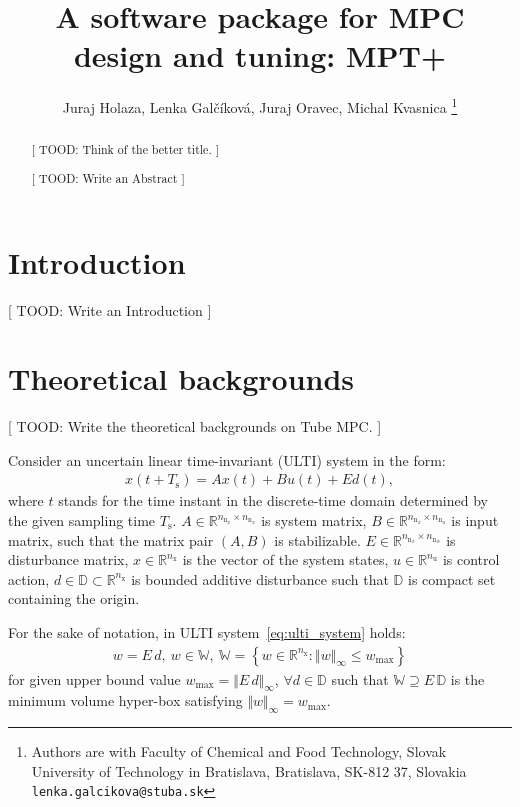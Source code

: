 \documentclass[letterpaper, 10 pt, conference]{ieeeconf}
\title{\LARGE \bf
A software package for MPC design and tuning: MPT+
}
\author{Juraj Holaza, Lenka Gal\v{c}\'{i}kov\'{a}, Juraj Oravec, Michal Kvasnica
\thanks{Authors are with Faculty of Chemical and Food Technology,
		Slovak University of Technology in Bratislava, Bratislava, SK-812 37, Slovakia
        \texttt{lenka.galcikova@stuba.sk}}
}
\begin{document}
\maketitle
\thispagestyle{empty}
\pagestyle{empty}

\begin{abstract}

[ TOOD: Think of the better title. ]

[ TOOD: Write an Abstract ]

\end{abstract}

\section{Introduction}
\label{sec:introduction}

[ TOOD: Write an Introduction ]


\section{Theoretical backgrounds}
\label{sec:tube_mpc}

[ TOOD: Write the theoretical backgrounds on Tube MPC. ]

Consider an uncertain linear time-invariant (ULTI) system in the form:
\begin{eqnarray}
	\label{eq:ulti_system}
	x(t+T_{\mathrm{s}}) = A x(t) + B u(t) + E d(t), %
\end{eqnarray}
where $t$ stands for the time instant in the discrete-time domain determined by the given sampling time $T_{\mathrm{s}}$. $A \in \mathbb{R}^{n_{\mathrm{n}_{x}} \times n_{\mathrm{n}_{x}}}$ is system matrix, $B \in \mathbb{R}^{n_{\mathrm{n}_{x}} \times n_{\mathrm{n}_{u}}}$ is input matrix, such that the matrix pair $(A,B)$ is stabilizable. $E \in \mathbb{R}^{n_{\mathrm{n}_{x}} \times n_{\mathrm{n}_{w}}}$ is disturbance matrix, $x \in \mathbb{R}^{n_{\mathrm{x}}}$ is the vector of the system states, $u \in \mathbb{R}^{n_{\mathrm{u}}}$ is control action, $d \in \mathbb{D} \subset \mathbb{R}^{n_{\mathrm{x}}}$ is bounded additive disturbance such that $\mathbb{D}$ is compact set containing the origin. 

For the sake of notation, in ULTI system~\eqref{eq:ulti_system} holds:
\begin{eqnarray}
	\label{eq:disturbance_set}
	w = E \, d, ~ w \in \mathbb{W}, ~ \mathbb{W} = \left\{ w \in \mathbb{R}^{n_{\mathrm{x}}} : \Vert w \Vert_{\infty} \leq w_{\max} \right\}
\end{eqnarray}
for given upper bound value $w_{\max} = \Vert E \, d \Vert_{\infty}$, $\forall d \in \mathbb{D}$ such that $\mathbb{W} \supseteq E \, \mathbb{D}$ is the minimum volume hyper-box satisfying $\Vert w \Vert_{\infty} = w_{\max}$.
\end{document}
